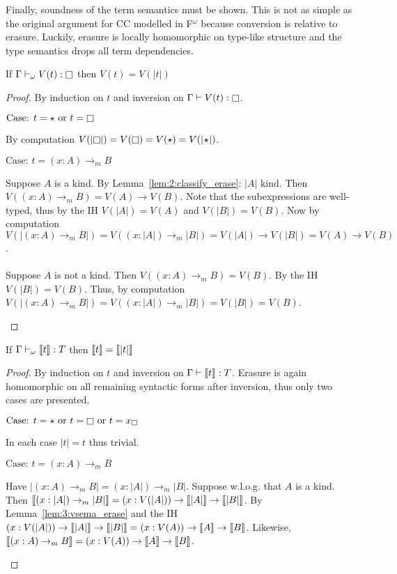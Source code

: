 Finally, soundness of the term semantics must be shown.
This is not as simple as the original argument for CC modelled in F$^\omega$ because conversion is relative to erasure.
Luckily, erasure is locally homomorphic on type-like structure and the type semantics drops all term dependencies.

\begin{lemma}
    \label{lem:3:vsema_erase}
    If $\Gamma \vdash_\omega V(t) : \kind$ then $V(t) = V(|t|)$
\end{lemma}
\begin{proof}
    By induction on $t$ and inversion on $\Gamma \vdash V(t) : \kind$.

    $\text{Case: } t = \star \text{ or } t = \kind$
    \begin{proofcase}
        By computation $V(|\kind|) = V(\kind) = V(\star) = V(|\!\star\!|)$.
    \end{proofcase}

    $\text{Case: } t = (x : A) \to_m B$
    \begin{proofcase}
        Suppose $A$ is a kind.
        By Lemma~\ref{lem:2:classify_erase}: $|A|$ kind.
        Then $V((x : A) \to_m B) = V(A) \to V(B)$.
        Note that the subexpressions are well-typed, thus by the IH $V(|A|) = V(A)$ and $V(|B|) = V(B)$.
        Now by computation $V(|(x : A) \to_m B|) = V((x : |A|) \to_m |B|) = V(|A|) \to V(|B|) = V(A) \to V(B)$.
        \\ \\
        Suppose $A$ is not a kind.
        Then $V((x : A) \to_m B) = V(B)$.
        By the IH $V(|B|) = V(B)$.
        Thus, by computation $V(|(x : A) \to_m B|) = V((x : |A|) \to_m |B|) = V(|B|) = V(B)$.
    \end{proofcase}
\end{proof}

\begin{lemma}
    \label{lem:3:sema_erase}
    If $\Gamma \vdash_\omega \llbracket t \rrbracket : T$ then $\llbracket t \rrbracket = \llbracket |t| \rrbracket$
\end{lemma}
\begin{proof}
    By induction on $t$ and inversion on $\Gamma \vdash \llbracket t \rrbracket : T$.
    Erasure is again homomorphic on all remaining syntactic forms after inversion, thus only two cases are presented.

    $\text{Case: } t = \star \text{ or } t = \kind \text{ or } t = x_\square$
    \begin{proofcase}
        In each case $|t| = t$ thus trivial.
    \end{proofcase}

    $\text{Case: } t = (x : A) \to_m B$
    \begin{proofcase}
        Have $|(x : A) \to_m B| = (x : |A|) \to_m |B|$.
        Suppose w.l.o.g. that $A$ is a kind.
        Then $\llbracket (x : |A|) \to_m |B| \rrbracket = (x : V(|A|)) \to \llbracket |A| \rrbracket \to \llbracket |B| \rrbracket$.
        By Lemma~\ref{lem:3:vsema_erase} and the IH $(x : V(|A|)) \to \llbracket |A| \rrbracket \to \llbracket |B| \rrbracket = (x : V(A)) \to \llbracket A \rrbracket \to \llbracket B \rrbracket$.
        Likewise, $\llbracket (x : A) \to_m B \rrbracket = (x : V(A)) \to \llbracket A \rrbracket \to \llbracket B \rrbracket$.
    \end{proofcase}
\end{proof}

